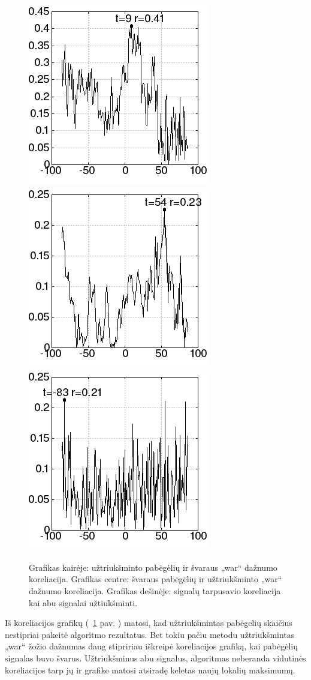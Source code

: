 \begin{figure}
    \includegraphics[scale=0.65]{../scripts/refugees_war_rand/result_ref_rand.png}
    \includegraphics[scale=0.65]{../scripts/refugees_war_rand/result_war_rand.png}
    \includegraphics[scale=0.65]{../scripts/refugees_war_rand/result_both_rand.png}
    \caption{Grafikas kairėje: užtriukšminto pabėgėlių ir švaraus „war“ dažnumo koreliacija. Grafikas centre: švaraus pabėgėlių ir užtriukšminto „war“ dažnumo koreliacija. Grafikas dešinėje: signalų tarpusavio koreliacija kai abu signalai užtiukšminti.}
    \label{fig:noisy_cross}
\end{figure}

Iš koreliacijos grafikų (~\ref{fig:noisy_cross} pav. ) matosi, kad užtriukšmintas pabėgelių skaičius nestipriai pakeitė algoritmo rezultatus.
Bet tokiu pačiu metodu užtriukšmintas „war“ žožio dažnumas daug stipririau iškreipė koreliacijos grafiką, kai pabėgėlių signalas buvo švarus.
Užtriukšminus abu signalus, algoritmas neberanda vidutinės koreliacijos tarp jų ir grafike matosi atsiradę keletas naujų lokalių maksimumų.
